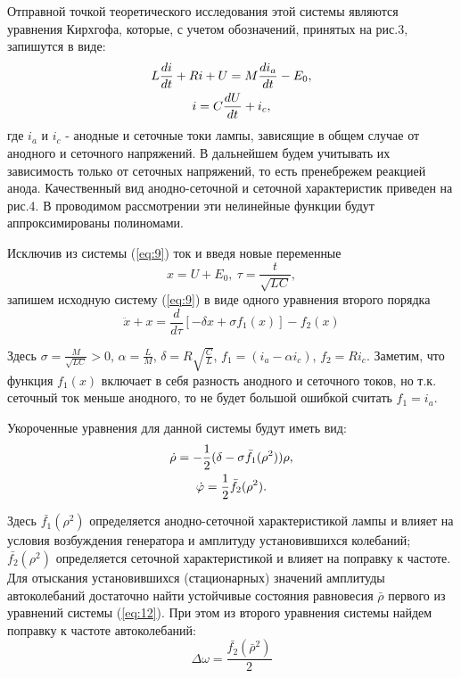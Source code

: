 Отправной точкой теоретического исследования этой системы являются уравнения Кирхгофа, которые, с учетом обозначений, принятых на рис.3, запишутся в виде:
\begin{gather}
\label{eq:9}
L\frac{di}{dt}+Ri+U=M\frac{di_a}{dt}-E_0,\\\notag
i=C\frac{dU}{dt}+i_c,
\end{gather}
где $i_a$ и $i_c$ - анодные и сеточные токи лампы, зависящие в общем случае от анодного и сеточного напряжений. В дальнейшем будем учитывать их зависимость только от сеточных напряжений, то есть пренебрежем реакцией анода. Качественный вид анодно-сеточной и сеточной характеристик приведен на рис.4. В проводимом рассмотрении эти нелинейные функции будут аппроксимированы полиномами. 

Исключив из системы (\ref{eq:9}) ток и введя новые переменные
\begin{equation}
\label{eq:10}
x=U+E_0, ~ \tau=\frac{t}{\sqrt{LC}},
\end{equation}
запишем исходную систему  (\ref{eq:9}) в виде одного уравнения второго порядка
\begin{equation}
\label{eq:11}
\ddot{x}+x=\frac{d}{d\tau}[-\delta x+\sigma f_1(x)]-f_2(x)
\end{equation}

Здесь $\sigma=\frac{M}{\sqrt{LC}}>0$, $\alpha=\frac{L}{M}$, $\delta=R\sqrt{\frac{C}{L}}$, $f_1=(i_a-\alpha i_c)$, $f_2=Ri_c$. Заметим, что функция $f_1(x)$ включает в себя разность анодного и сеточного токов, но т.к. сеточный ток меньше анодного, то не будет большой ошибкой считать $f_1=i_a$.

Укороченные уравнения для данной системы будут иметь вид:
\begin{gather}
\label{eq:12}
\dot\rho=-\frac{1}{2} (\delta-\sigma \bar{f_1}(\rho^2))\rho,\\\notag
\dot\varphi=\frac{1}{2}\bar{f_2}(\rho^2).
\end{gather}

Здесь $\bar{f_1}(\rho^2)$  определяется анодно-сеточной характеристикой лампы и влияет на условия возбуждения генератора и амплитуду установившихся колебаний;  $\bar{f_2}(\rho^2)$ определяется сеточной характеристикой и влияет на поправку к частоте. Для отыскания установившихся (стационарных) значений амплитуды автоколебаний достаточно найти устойчивые состояния равновесия  $\bar{\rho}$  первого из уравнений системы (\ref{eq:12}). При этом из второго уравнения системы найдем поправку к частоте автоколебаний:
\begin{equation}
\label{eq:13}
\Delta \omega=\frac{\bar{f_2}(\bar{\rho}^2)}{2}
\end{equation}

